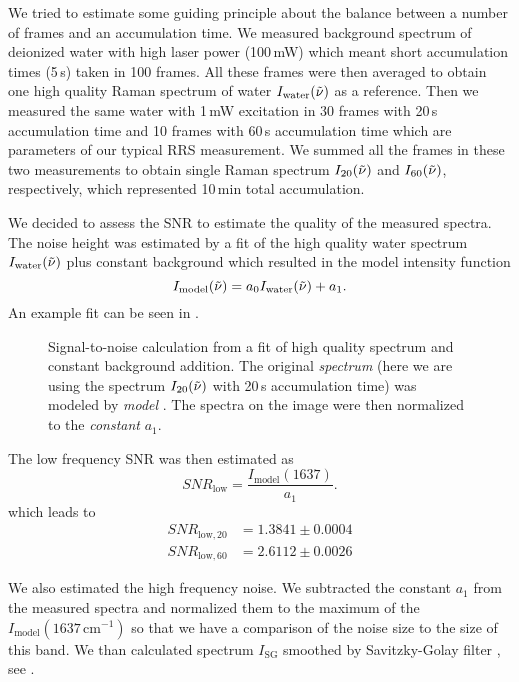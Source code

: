 We tried to estimate some guiding principle about the balance between a number
of frames and an accumulation time. We measured background spectrum of
deionized water with high laser power (100\,mW) which meant short accumulation
times (5\,s) taken in 100 frames. All these frames were then averaged to obtain
one high quality Raman spectrum of water $I_\text{water}(\tilde{\nu})$ as a reference.
Then we measured the same water with 1\,mW excitation in 30 frames with 20\,s
accumulation time and 10 frames with 60\,s accumulation time which are
parameters of our typical RRS measurement. We summed all the frames in these
two measurements to obtain single Raman spectrum $I_{20}(\tilde{\nu})$ and
$I_{60}(\tilde{\nu})$, respectively, which represented 10\,min total accumulation.

We decided to assess the SNR to estimate the quality of the measured spectra.
The noise height was estimated by a fit of the high quality water spectrum
$I_\text{water}(\tilde{\nu})$ plus constant background which resulted in the model
intensity function
\begin{equation}
	I_\text{model}(\wn) = a_0 I_\text{water}(\wn) + a_1.
	\label{\eqnlabel{accum_length:sn_model}}
\end{equation}
An example fit can be seen in .

\begin{figure}
	\centering
	
	\caption{Signal-to-noise calculation from a fit of high quality spectrum
		and constant background addition. The original \emph{spectrum} (here we are
		using the spectrum $I_{20}(\tilde{\nu})$ with 20\,s accumulation time) was modeled
		by \emph{model} . The spectra on
		the image were then normalized to the \emph{constant} $a_1$.}
	\label{\figlabel{accum_length:sn_ratio}}
\end{figure}

The low frequency SNR was then estimated as
\begin{equation*}
	SNR_\text{low} = \frac{I_\text{model}(1637)}{a_1}.
\end{equation*}
which leads to
\begin{align*}
	SNR_{\text{low},20} &= 1.3841 \pm 0.0004 \\
	SNR_{\text{low},60} &= 2.6112 \pm 0.0026
\end{align*}

We also estimated the high frequency noise. We subtracted the constant $a_1$
from the measured spectra and normalized them to the maximum of the
$I_\text{model}(1637\,\text{cm}^{-1})$
so that we have a comparison of the noise size to the size of this band. We
than calculated spectrum $I_\text{SG}$ smoothed by Savitzky-Golay filter
\parencite{Savitzky1964},
see
.

